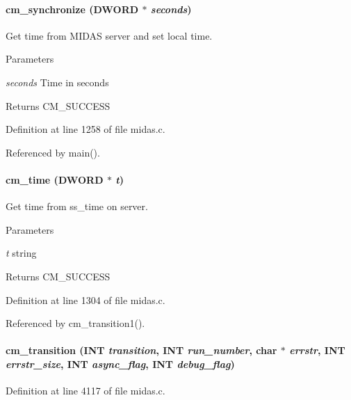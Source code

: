 \paragraph[{cm\_\-synchronize}]{ cm\_\-synchronize ({\bf DWORD} $\ast$ {\em seconds})}\hfill\label{group__cmfunctionc_ga89d09a1a52a983be86ef502614fe555c}
Get time from MIDAS server and set local time. 
\begin{DoxyParams}{Parameters}
\item[{\em seconds}]Time in seconds \end{DoxyParams}
\begin{DoxyReturn}{Returns}
CM\_\-SUCCESS 
\end{DoxyReturn}


Definition at line 1258 of file midas.c.

Referenced by main().
\paragraph[{cm\_\-time}]{ cm\_\-time ({\bf DWORD} $\ast$ {\em t})}\hfill\label{group__cmfunctionc_gaf53e87e278dd31007a84cf643eddba2b}
Get time from ss\_\-time on server. 
\begin{DoxyParams}{Parameters}
\item[{\em t}]string \end{DoxyParams}
\begin{DoxyReturn}{Returns}
CM\_\-SUCCESS 
\end{DoxyReturn}


Definition at line 1304 of file midas.c.

Referenced by cm\_\-transition1().
\paragraph[{cm\_\-transition}]{ cm\_\-transition ({\bf INT} {\em transition}, \/  {\bf INT} {\em run\_\-number}, \/  char $\ast$ {\em errstr}, \/  {\bf INT} {\em errstr\_\-size}, \/  {\bf INT} {\em async\_\-flag}, \/  {\bf INT} {\em debug\_\-flag})}\hfill\label{group__cmfunctionc_ga376defd443d6bdfcca3830b99986a48d}


Definition at line 4117 of file midas.c.

